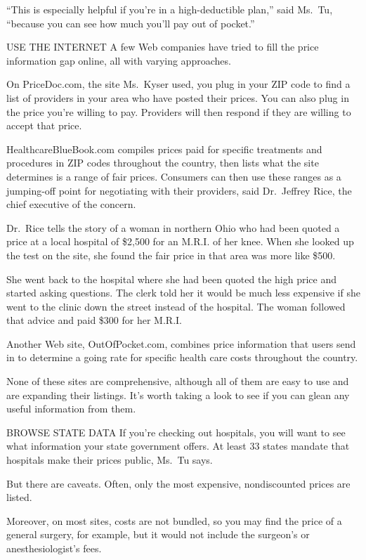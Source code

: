 ﻿\documentclass[12pt]{article}
\begin{document}
``This is especially helpful if you're in a high-deductible plan,'' said Ms.~Tu, ``because you can
see how much you'll pay out of pocket.''

USE THE INTERNET A few Web companies have tried to fill the price information gap online, all with
varying approaches.

On PriceDoc.com, the site Ms.~Kyser used, you plug in your ZIP code to find a list of providers in
your area who have posted their prices. You can also plug in the price you're willing to pay.
Providers will then respond if they are willing to accept that price.

HealthcareBlueBook.com compiles prices paid for specific treatments and procedures in ZIP codes
throughout the country, then lists what the site determines is a range of fair prices. Consumers can
then use these ranges as a jumping-off point for negotiating with their providers, said Dr.~Jeffrey
Rice, the chief executive of the concern.

Dr.~Rice tells the story of a woman in northern Ohio who had been quoted a price at a local hospital
of \$2,500 for an M.R.I. of her knee. When she looked up the test on the site, she found the fair
price in that area was more like \$500.

She went back to the hospital where she had been quoted the high price and started asking questions.
The clerk told her it would be much less expensive if she went to the clinic down the street instead
of the hospital. The woman followed that advice and paid \$300 for her M.R.I.

Another Web site, OutOfPocket.com, combines price information that users send in to determine a
going rate for specific health care costs throughout the country.

None of these sites are comprehensive, although all of them are easy to use and are expanding their
listings. It's worth taking a look to see if you can glean any useful information from them.

BROWSE STATE DATA If you're checking out hospitals, you will want to see what information your state
government offers. At least 33 states mandate that hospitals make their prices public, Ms.~Tu says.

But there are caveats. Often, only the most expensive, nondiscounted prices are listed.

Moreover, on most sites, costs are not bundled, so you may find the price of a general surgery, for
example, but it would not include the surgeon's or anesthesiologist's fees.
\end{document}
